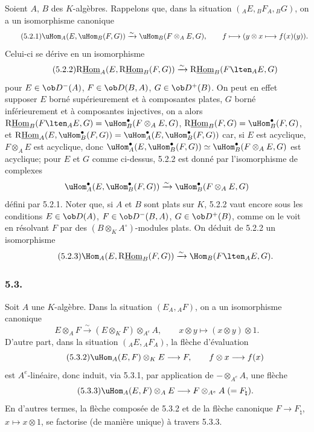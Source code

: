 Soient $A$, $B$ des $K$-algèbres. Rappelons que, dans la situation $({}_AE,{}_BF_A,{}_BG)$, on a un isomorphisme canonique
\begin{equation}\tag{5.2.1}
\uHom_A(E,\uHom_B(F,G))\xrightarrow{\sim}\uHom_B(F\otimes_AE,G),\qquad
f\longmapsto (y\otimes x\longmapsto f(x)(y)).
\end{equation}
Celui-ci se dérive en un isomorphisme
\begin{equation}\tag{5.2.2}
\mathrm{R}\underline{\mathrm{Hom}}_A(E,\mathrm{R}\underline{\mathrm{Hom}}_B(F,G))\xrightarrow{\sim}\mathrm{R}\underline{\mathrm{Hom}}_B(F\lten_AE,G)
\end{equation}
pour $E\in\ob D^-(A)$, $F\in\ob D(B,A)$, $G\in\ob D^+(B)$. On peut en effet supposer $E$ borné supérieurement et à composantes plates, $G$ borné inférieurement et à composantes injectives, on a alors $\mathrm{R}\underline{\mathrm{Hom}}_B(F\lten_AE,G)=\uHom_B^\bullet(F\otimes_AE,G)$, $\mathrm{R}\underline{\mathrm{Hom}}_B(F,G)=\uHom_B^\bullet(F,G)$, et $\mathrm{R}\underline{\mathrm{Hom}}_A(E,\uHom_B^\bullet(F,G))=\uHom_A^\bullet(E,\uHom_B^\bullet(F,G))$ car, si $E$ est acyclique, $F\otimes_AE$ est acyclique, donc $\uHom_A^\bullet(E,\uHom_B^\bullet(F,G))\simeq\uHom_B^\bullet(F\otimes_AE,G)$ est acyclique; pour $E$ et $G$ comme ci-dessus, 5.2.2 est donné par l'isomorphisme de complexes
\[
\uHom_A^\bullet(E,\uHom_B^\bullet(F,G))\xrightarrow{\sim}\uHom_B^\bullet(F\otimes_AE,G)
\]
défini par 5.2.1. Noter que, si $A$ et $B$ sont plats sur $K$, 5.2.2 vaut encore sous les conditions $E\in\ob D(A)$, $F\in\ob D^-(B,A)$, $G\in\ob D^+(B)$, comme on le voit en résolvant $F$ par des $(B\otimes_KA^\circ)$-modules plats. On déduit de 5.2.2 un isomorphisme
\begin{equation}\tag{5.2.3}
\Hom_A(E,\mathrm{R}\underline{\mathrm{Hom}}_B(F,G))\xrightarrow{\sim}\Hom_B(F\lten_AE,G).
\end{equation}

\subsubsection*{5.3.}

Soit $A$ une $K$-algèbre. Dans la situation $(E_A,{}_AF)$, on a un isomorphisme canonique
\begin{equation}\tag{5.3.1}
E\otimes_AF\xrightarrow{\sim}(E\otimes_KF)\otimes_{A^e}A,
\qquad x\otimes y\longmapsto (x\otimes y)\otimes 1.
\end{equation}
D'autre part, dans la situation $({}_AE,{}_AF_A)$, la flèche d'évaluation
\begin{equation}\tag{5.3.2}
\uHom_A(E,F)\otimes_KE\longrightarrow F,
\qquad f\otimes x\longrightarrow f(x)
\end{equation}
est $A^e$-linéaire, donc induit, via 5.3.1, par application de $-\otimes_{A^e}A$, une flèche
\begin{equation}\tag{5.3.3}
\uHom_A(E,F)\otimes_AE\longrightarrow F\otimes_{A^e}A\;(=F_\natural).
\end{equation}
En d'autres termes, la flèche composée de 5.3.2 et de la flèche canonique $F\to F_\natural$, $x\mapsto x\otimes 1$, se factorise (de manière unique) à travers 5.3.3.

